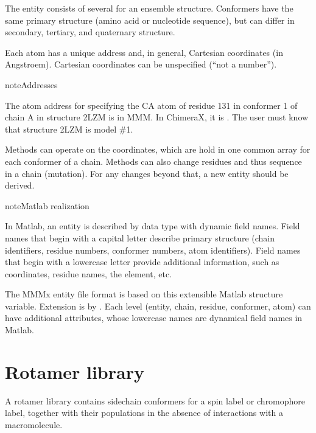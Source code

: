 \documentclass[letterpaper,10pt,english]{sphinxmanual}
\begin{document}
The entity consists of several  for an ensemble structure. Conformers have the same primary structure (amino acid or nucleotide sequence), but can differ in secondary, tertiary, and quaternary structure.

Each atom has a unique address and, in general, Cartesian coordinates (in Angstroem). Cartesian coordinates can be unspecified (“not a number”).

\begin{sphinxadmonition}{note}{Addresses}

The atom address for specifying the CA atom of residue 131 in conformer 1 of chain A in structure 2LZM is  in MMM. In ChimeraX, it is . The user must know that structure 2LZM is model \#1.
\end{sphinxadmonition}

Methods can operate on the coordinates, which are hold in one common array for each conformer of a chain. Methods can also change residues and thus sequence in a chain (mutation). For any changes beyond that, a new entity should be derived.

\begin{sphinxadmonition}{note}{Matlab realization}

In Matlab, an entity is described by data type  with dynamic field names. Field names that begin with a capital letter describe primary structure (chain identifiers, residue numbers, conformer numbers, atom identifiers). Field names that begin with a lower\sphinxhyphen{}case letter provide additional information, such as coordinates, residue names, the element, etc.
\end{sphinxadmonition}

The MMMx entity file format is based on this extensible Matlab structure variable. Extension is by . Each level (entity, chain, residue, conformer, atom) can have additional attributes, whose lower\sphinxhyphen{}case names are dynamical field names in Matlab.


\section{Rotamer library}
\label{\detokenize{data:rotamer-library}}
A rotamer library contains sidechain conformers for a spin label or chromophore label, together with their populations in the absence of interactions with a macromolecule.
\end{document}
